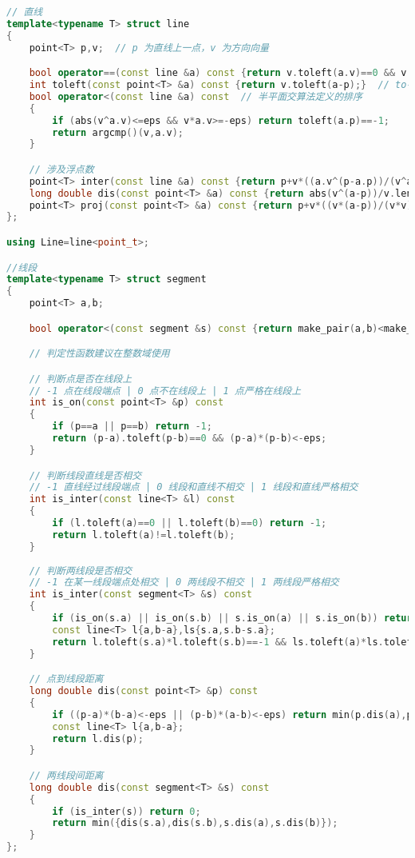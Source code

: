 \documentclass[a4paper]{book}
\begin{document}
\begin{lstlisting}[language=c++]
// 直线
template<typename T> struct line
{
    point<T> p,v;  // p 为直线上一点，v 为方向向量

    bool operator==(const line &a) const {return v.toleft(a.v)==0 && v.toleft(p-a.p)==0;}
    int toleft(const point<T> &a) const {return v.toleft(a-p);}  // to-left 测试
    bool operator<(const line &a) const  // 半平面交算法定义的排序
    {
        if (abs(v^a.v)<=eps && v*a.v>=-eps) return toleft(a.p)==-1;
        return argcmp()(v,a.v);
    }

    // 涉及浮点数
    point<T> inter(const line &a) const {return p+v*((a.v^(p-a.p))/(v^a.v));}  // 直线交点
    long double dis(const point<T> &a) const {return abs(v^(a-p))/v.len();}  // 点到直线距离
    point<T> proj(const point<T> &a) const {return p+v*((v*(a-p))/(v*v));}  // 点在直线上的投影
};

using Line=line<point_t>;

//线段
template<typename T> struct segment
{
    point<T> a,b;

    bool operator<(const segment &s) const {return make_pair(a,b)<make_pair(s.a,s.b);}

    // 判定性函数建议在整数域使用

    // 判断点是否在线段上
    // -1 点在线段端点 | 0 点不在线段上 | 1 点严格在线段上
    int is_on(const point<T> &p) const  
    {
        if (p==a || p==b) return -1;
        return (p-a).toleft(p-b)==0 && (p-a)*(p-b)<-eps;
    }

    // 判断线段直线是否相交
    // -1 直线经过线段端点 | 0 线段和直线不相交 | 1 线段和直线严格相交
    int is_inter(const line<T> &l) const
    {
        if (l.toleft(a)==0 || l.toleft(b)==0) return -1;
        return l.toleft(a)!=l.toleft(b);
    }
    
    // 判断两线段是否相交
    // -1 在某一线段端点处相交 | 0 两线段不相交 | 1 两线段严格相交
    int is_inter(const segment<T> &s) const
    {
        if (is_on(s.a) || is_on(s.b) || s.is_on(a) || s.is_on(b)) return -1;
        const line<T> l{a,b-a},ls{s.a,s.b-s.a};
        return l.toleft(s.a)*l.toleft(s.b)==-1 && ls.toleft(a)*ls.toleft(b)==-1;
    }

    // 点到线段距离
    long double dis(const point<T> &p) const
    {
        if ((p-a)*(b-a)<-eps || (p-b)*(a-b)<-eps) return min(p.dis(a),p.dis(b));
        const line<T> l{a,b-a};
        return l.dis(p);
    }

    // 两线段间距离
    long double dis(const segment<T> &s) const
    {
        if (is_inter(s)) return 0;
        return min({dis(s.a),dis(s.b),s.dis(a),s.dis(b)});
    }
};


\end{lstlisting}
\end{document}
